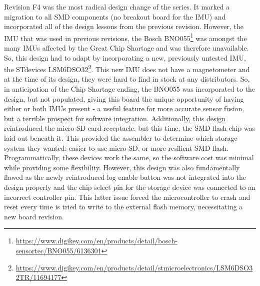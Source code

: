 
Revision F4 was the most radical design change of the series.
It marked a migration to all SMD components (no breakout board for the IMU) and incorporated all of the design lessons from the previous revision.
However, the IMU that was used in previous revisions, the Bosch BNO055\footnote{\url{https://www.digikey.com/en/products/detail/bosch-sensortec/BNO055/6136301}} was amongst the many IMUs affected by the Great Chip Shortage and was therefore unavailable.
So, this design had to adapt by incorporating a new, previously untested IMU, the STdevices LSM6DSO32\footnote{\url{https://www.digikey.com/en/products/detail/stmicroelectronics/LSM6DSO32TR/11694177}}.
This new IMU does not have a magnetometer and at the time of its design, they were hard to find in stock at any distributors.
So, in anticipation of the Chip Shortage ending, the BNO055 was incorporated to the design, but not populated, giving this board the unique opportunity of having either or both IMUs present - a useful feature for more accurate sensor fusion, but a terrible prospect for software integration.
Additionally, this design reintroduced the micro SD card receptacle, but this time, the SMD flash chip was laid out beneath it.
This provided the assembler to determine which storage system they wanted: easier to use micro SD, or more resilient SMD flash.
Programmatically, these devices work the same, so the software cost was minimal while providing some flexibility.
However, this design was also fundamentally flawed as the newly reintroduced log enable button was not integrated into the design properly and the chip select pin for the storage device was connected to an incorrect controller pin.
This latter issue forced the microcontroller to crash and reset every time is tried to write to the external flash memory, necessitating a new board revision.


